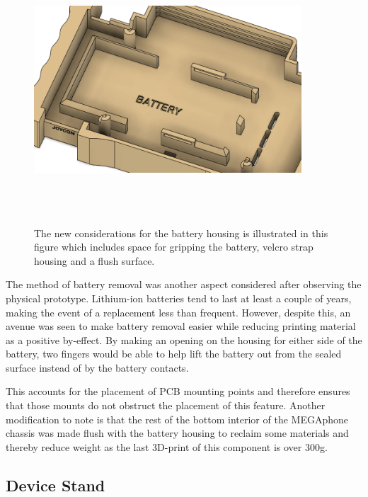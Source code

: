 \begin{figure} [h]
    \centering
    \includegraphics[width=10cm,height=10cm,keepaspectratio]{Figures/battery_new.png}
    \caption{The new considerations for the battery housing is illustrated in this figure which includes space for gripping the battery, velcro strap housing and a flush surface.}
    \label{fig:NewBatteryHousing}
\end{figure}

The method of battery removal was another aspect considered after observing the physical prototype.
Lithium-ion batteries tend to last at least a couple of years, making the event of a replacement less than frequent.
However, despite this, an avenue was seen to make battery removal easier while reducing printing material as a positive by-effect.
By making an opening on the housing for either side of the battery, two fingers would be able to help lift the battery out from the sealed surface instead of by the battery contacts.

This accounts for the placement of PCB mounting points and therefore ensures that those mounts do not obstruct the placement of this feature.
Another modification to note is that the rest of the bottom interior of the MEGAphone chassis was made flush with the battery housing to reclaim some materials and thereby reduce weight as the last 3D-print of this component is over 300g.

\subsection{Device Stand}

